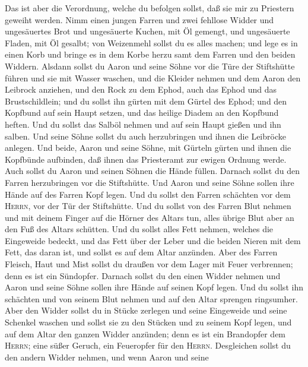  Das ist aber die Verordnung, welche du befolgen sollst,
daß sie mir zu Priestern geweiht werden. Nimm einen jungen Farren und
zwei fehllose Widder  und ungesäuertes Brot und
ungesäuerte Kuchen, mit Öl gemengt, und ungesäuerte Fladen, mit Öl
gesalbt; von Weizenmehl sollst du es alles machen;  und
lege es in einen Korb und bringe es in dem Korbe herzu samt dem Farren
und den beiden Widdern.  Alsdann sollst du Aaron und seine
Söhne vor die Türe der Stiftshütte führen und sie mit Wasser waschen,
 und die Kleider nehmen und dem Aaron den Leibrock
anziehen, und den Rock zu dem Ephod, auch das Ephod und das
Brustschildlein; und du sollst ihn gürten mit dem Gürtel des Ephod;
 und den Kopfbund auf sein Haupt setzen, und das heilige
Diadem an den Kopfbund heften.  Und du sollst das Salböl
nehmen und auf sein Haupt gießen und ihn salben.  Und
seine Söhne sollst du auch herzubringen und ihnen die Leibröcke anlegen.
 Und beide, Aaron und seine Söhne, mit Gürteln gürten und
ihnen die Kopfbünde aufbinden, daß ihnen das Priesteramt zur ewigen
Ordnung werde. Auch sollst du Aaron und seinen Söhnen die Hände füllen.
 Darnach sollst du den Farren herzubringen vor die
Stiftshütte. Und Aaron und seine Söhne sollen ihre Hände auf des Farren
Kopf legen.  Und du sollst den Farren schächten vor dem
\textsc{Herrn}, vor der Tür der Stiftshütte.  Und du
sollst von des Farren Blut nehmen und mit deinem Finger auf die Hörner
des Altars tun, alles übrige Blut aber an den Fuß des Altars schütten.
 Und du sollst alles Fett nehmen, welches die Eingeweide
bedeckt, und das Fett über der Leber und die beiden Nieren mit dem Fett,
das daran ist, und sollst es auf dem Altar anzünden. 
Aber des Farren Fleisch, Haut und Mist sollst du draußen vor dem Lager
mit Feuer verbrennen; denn es ist ein Sündopfer.  Darnach
sollst du den einen Widder nehmen und Aaron und seine Söhne sollen ihre
Hände auf seinen Kopf legen.  Und du sollst ihn schächten
und von seinem Blut nehmen und auf den Altar sprengen ringsumher.
 Aber den Widder sollst du in Stücke zerlegen und seine
Eingeweide und seine Schenkel waschen und sollst sie zu den Stücken und
zu seinem Kopf legen,  und auf dem Altar den ganzen
Widder anzünden; denn es ist ein Brandopfer dem \textsc{Herrn}; eine
süßer Geruch, ein Feueropfer für den \textsc{Herrn}. 
Desgleichen sollst du den andern Widder nehmen, und wenn Aaron und seine
